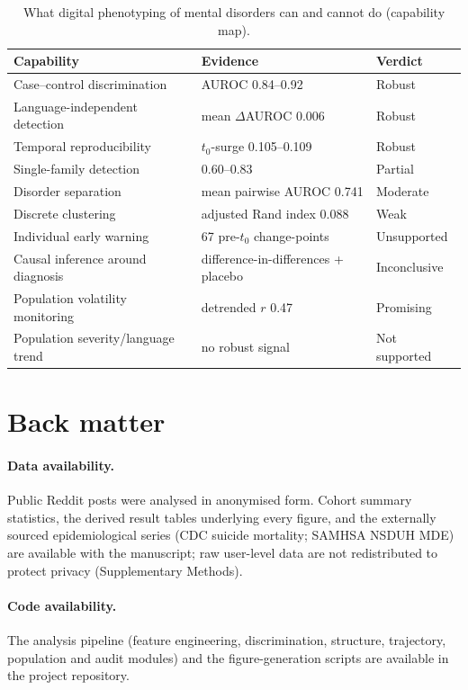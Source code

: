 \documentclass[11pt]{article}
\begin{document}
\begin{table}[t]\centering\small
\caption{What digital phenotyping of mental disorders can and cannot do (capability map).}
\label{tab:capability}
\begin{tabular}{lll}
\toprule
Capability & Evidence & Verdict \\
\midrule
Case--control discrimination & AUROC 0.84--0.92 & Robust \\
Language-independent detection & mean $\Delta$AUROC 0.006 & Robust \\
Temporal reproducibility & $t_0$-surge 0.105--0.109 & Robust \\
Single-family detection & 0.60--0.83 & Partial \\
Disorder separation & mean pairwise AUROC 0.741 & Moderate \\
Discrete clustering & adjusted Rand index 0.088 & Weak \\
Individual early warning & 67 pre-$t_0$ change-points & Unsupported \\
Causal inference around diagnosis & difference-in-differences + placebo & Inconclusive \\
Population volatility monitoring & detrended $r$ 0.47 & Promising \\
Population severity/language trend & no robust signal & Not supported \\
\bottomrule
\end{tabular}
\end{table}

\section*{Back matter}
\paragraph*{Data availability.} Public Reddit posts were analysed in anonymised form. Cohort
summary statistics, the derived result tables underlying every figure, and the externally
sourced epidemiological series (CDC suicide mortality; SAMHSA NSDUH MDE) are available with the
manuscript; raw user-level data are not redistributed to protect privacy (Supplementary
Methods).
\paragraph*{Code availability.} The analysis pipeline (feature engineering, discrimination,
structure, trajectory, population and audit modules) and the figure-generation scripts are
available in the project repository.
\end{document}
